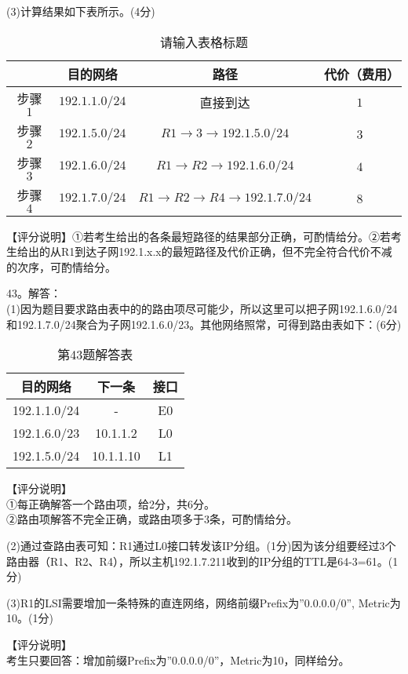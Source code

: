 (3)计算结果如下表所示。(4分) \\
\begin{table}[ht]
\centering
\caption{请输入表格标题}\label{tab_CSN14_5}
\begin{tabular}{|c|c|c|c|}
\hline
 & 目的网络 & 路径 & 代价（费用）  \\
\hline
步骤 $1$ & $192.1.1.0/24$ & 直接到达 & $1$  \\
\hline
步骤 $2$ & $192.1.5.0/24$ & $R1 \rightarrow 3 \rightarrow 192.1.5.0/24$ & $3$  \\
\hline
步骤 $3$ & $192.1.6.0/24$ & $R1\rightarrow R2\rightarrow 192.1.6.0/24$ & $4$  \\
\hline
步骤 $4$ & $192.1.7.0/24$ & $R1 \rightarrow R2 \rightarrow R4 \rightarrow 192.1.7.0/24$ & $8$  \\
\hline
\end{tabular}
\end{table}
【评分说明】①若考生给出的各条最短路径的结果部分正确，可酌情给分。②若考生给出的从R1到达子网192.1.x.x的最短路径及代价正确，但不完全符合代价不减的次序，可酌情给分。

43。解答： \\
(1)因为题目要求路由表中的的路由项尽可能少，所以这里可以把子网192.1.6.0/24和192.1.7.0/24聚合为子网192.1.6.0/23。其他网络照常，可得到路由表如下：(6分)

\begin{table}[ht]
\centering
\caption{第43题解答表}\label{tab_CSN14_6}
\begin{tabular}{|c|c|c|}
\hline
目的网络 & 下一条 & 接口 \\
\hline
192.1.1.0/24 & - & E0 \\
\hline
192.1.6.0/23 & 10.1.1.2 & L0 \\
\hline
192.1.5.0/24 & 10.1.1.10 & L1 \\
\hline
\end{tabular}
\end{table}
【评分说明】 \\
①每正确解答一个路由项，给2分，共6分。  \\
②路由项解答不完全正确，或路由项多于3条，可酌情给分。

(2)通过查路由表可知：R1通过L0接口转发该IP分组。(1分)因为该分组要经过3个路由器（R1、R2、R4），所以主机192.1.7.211收到的IP分组的TTL是64-3=61。(1分)

(3)R1的LSI需要增加一条特殊的直连网络，网络前缀Prefix为”0.0.0.0/0”, Metric为10。(1分)

【评分说明】 \\
考生只要回答：增加前缀Prefix为”0.0.0.0/0”，Metric为10，同样给分。

